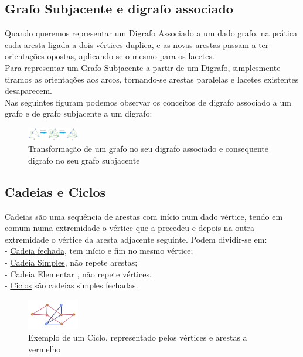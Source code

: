 \subsection{Grafo Subjacente e digrafo associado}
Quando queremos representar um Digrafo Associado a um dado grafo, na prática cada aresta ligada a 
dois vértices duplica, e as novas arestas passam a ter orientações opostas, aplicando-se o mesmo para os 
lacetes.\\
\indent Para representar um Grafo Subjacente a partir de um Digrafo, simplesmente tiramos as orientações aos 
arcos, tornando-se arestas paralelas e lacetes existentes desaparecem.\\
\indent Nas seguintes figuram podemos observar os conceitos de digrafo associado a um grafo e de grafo 
subjacente a um digrafo:\\

\begin{figure}[h]
    \centering
    \includegraphics[width=0.2\textwidth]{imgs/Figura8}
    \caption{Transformação de um grafo no seu digrafo associado e consequente digrafo no seu grafo 
    subjacente
    \label{fig:imagem8}}
\end{figure}
\pagebreak
\subsection{ Cadeias e Ciclos}
Cadeias são uma sequência de arestas com início num dado vértice, tendo em comum numa extremidade 
o vértice que a precedeu e depois na outra extremidade o vértice da aresta adjacente seguinte. Podem 
dividir-se em:\\
\indent - \underline{Cadeia fechada}, tem início e fim no mesmo vértice;\\
\indent - \underline{Cadeia Simples}, não repete arestas;\\
\indent - \underline{Cadeia Elementar} , não repete vértices.\\
\indent - \underline{Ciclos} são cadeias simples fechadas.\\

\begin{figure}[h]
    \centering
    \includegraphics[width=0.2\textwidth]{imgs/Figura9}
    \caption{ Exemplo de um Ciclo, representado pelos vértices e arestas a vermelho\label{fig:imagem9}}
\end{figure}

